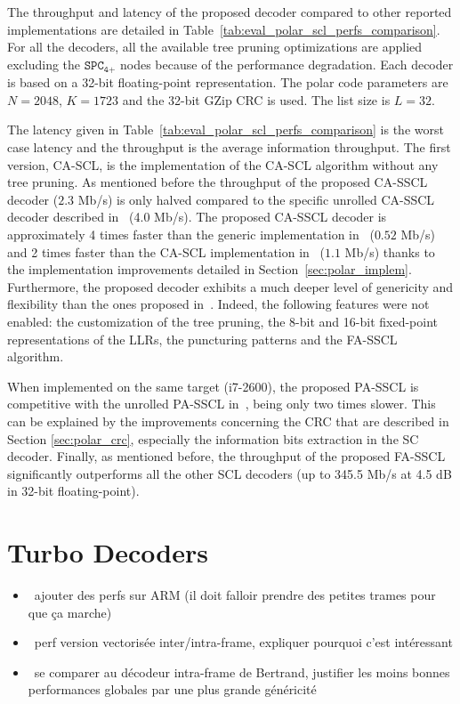 The throughput and latency of the proposed decoder compared to other reported
implementations are detailed in Table~\ref{tab:eval_polar_scl_perfs_comparison}.
For all the decoders, all the available tree pruning optimizations are applied
excluding the $\texttt{SPC}_\texttt{4+}$ nodes because of the performance
degradation. Each decoder is based on a 32-bit floating-point representation.
The polar code parameters are $N=2048$, $K=1723$ and the 32-bit GZip CRC is
used. The list size is $L=32$.

The latency given in Table~\ref{tab:eval_polar_scl_perfs_comparison} is the
worst case latency and the throughput is the average information throughput. The
first version, CA-SCL, is the implementation of the CA-SCL algorithm without any
tree pruning. As mentioned before the throughput of the proposed CA-SSCL decoder
($2.3$ Mb/s) is only halved compared to the specific unrolled CA-SSCL decoder
described in~\cite{Sarkis2016} (4.0 Mb/s). The proposed CA-SSCL decoder is
approximately 4 times faster than the generic implementation
in~\cite{Sarkis2014b} ($0.52$ Mb/s) and 2 times faster than the CA-SCL
implementation in~\cite{Shen2016} ($1.1$ Mb/s) thanks to the implementation
improvements detailed in Section~\ref{sec:polar_implem}. Furthermore, the
proposed decoder exhibits a much deeper level of genericity and flexibility than
the ones proposed in~\cite{Sarkis2014,Shen2016}. Indeed, the following features
were not enabled: the customization of the tree pruning, the 8-bit and 16-bit
fixed-point representations of the LLRs, the puncturing patterns and the FA-SSCL
algorithm.

When implemented on the same target (i7-2600), the proposed PA-SSCL is
competitive with the unrolled PA-SSCL in~\cite{Sarkis2016}, being only two times
slower. This can be explained by the improvements concerning the CRC that are
described in Section \ref{sec:polar_crc}, especially the information bits
extraction in the SC decoder. Finally, as mentioned before, the throughput of
the proposed FA-SSCL significantly outperforms all the other SCL decoders (up to
345.5 Mb/s at 4.5 dB in 32-bit floating-point).

\section{Turbo Decoders}
\label{sec:eval_turbo}

\begin{itemize}
  \item \xmark~ajouter des perfs sur ARM (il doit falloir prendre des petites
    trames pour que ça marche)
  \item \xmark~perf version vectorisée inter/intra-frame, expliquer pourquoi
    c'est intéressant
  \item \xmark~se comparer au décodeur intra-frame de Bertrand, justifier les
    moins bonnes performances globales par une plus grande généricité
\end{itemize}

